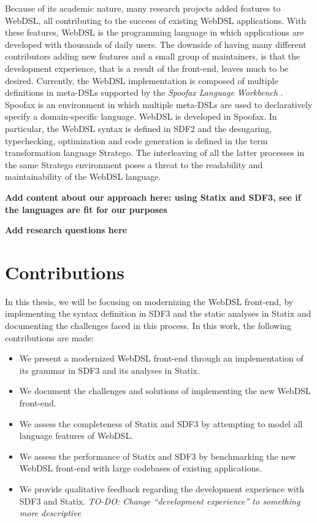   Because of its academic nature, many research projects added features to WebDSL, all contributing to the success of existing WebDSL applications. With these features, WebDSL is the programming language in which applications are developed with thousands of daily users. The downside of having many different contributors adding new features and a small group of maintainers, is that the development experience, that is a result of the front-end, leaves much to be desired. Currently, the WebDSL implementation is composed of multiple definitions in meta-DSLs supported by the \textit{Spoofax Language Workbench} \autocite{KatsV10}. Spoofax is an environment in which multiple meta-DSLs are used to declaratively specify a domain-specific language. WebDSL is developed in Spoofax. In particular, the WebDSL syntax is defined in SDF2 and the desugaring, typechecking, optimization and code generation is defined in the term transformation language Stratego. The interleaving of all the latter processes in the same Stratego environment poses a threat to the readability and maintainability of the WebDSL language.

  \textbf{Add content about our approach here: using Statix and SDF3, see if the languages are fit for our purposes}

  \textbf{Add research questions here}

  \section{\label{sec:contributions}Contributions}
    In this thesis, we will be focusing on modernizing the WebDSL front-end, by implementing the syntax definition in SDF3 and the static analyses in Statix and documenting the challenges faced in this process. In this work, the following contributions are made:

    \begin{itemize}
      \item We present a modernized WebDSL front-end through an implementation of its grammar in SDF3 and its analyses in Statix.
      \item We document the challenges and solutions of implementing the new WebDSL front-end.
      \item We assess the completeness of Statix and SDF3 by attempting to model all language features of WebDSL.
      \item We assess the performance of Statix and SDF3 by benchmarking the new WebDSL front-end with large codebases of existing applications.
      \item We provide qualitative feedback regarding the development experience with SDF3 and Statix. \textit{TO-DO: Change ``development experience'' to something more descriptive}
    \end{itemize}

